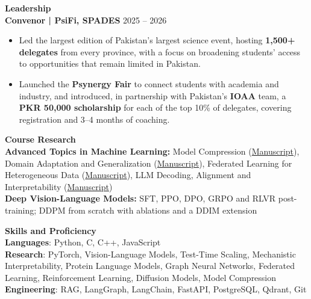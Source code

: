 \documentclass[11pt]{article}
\begin{document}
\vspace{0.3cm}
{\large \textbf{Leadership}}
\vspace{0.15cm}\\
\textbf{Convenor | PsiFi, SPADES} \hfill 2025 – 2026
\begin{itemize}[noitemsep, topsep=0pt, partopsep=0pt, parsep=0pt]
    \item Led the largest edition of Pakistan's largest science event, hosting \textbf{1,500+ delegates} from every province, with a focus on broadening students' access to opportunities that remain limited in Pakistan.
    \item Launched the \textbf{Psynergy Fair} to connect students with academia and industry, and introduced, in partnership with Pakistan's \textbf{IOAA} team, a \textbf{PKR 50,000 scholarship} for each of the top 10\% of delegates, covering registration and 3--4 months of coaching.
\end{itemize}

\vspace{0.3cm}
{\large \textbf{Course Research}}
\vspace{0.15cm}\\
\textbf{Advanced Topics in Machine Learning:} Model Compression (\href{https://drive.google.com/file/d/1n5PtRXa3tH3fdoNcJMYTQIa17mt-1_Jc/view?usp=sharing}{Manuscript}), Domain Adaptation and Generalization (\href{https://drive.google.com/file/d/1snDSYv7AWhGc1WMA92vnHNt5c0ll3335/view?usp=sharing}{Manuscript}), Federated Learning for Heterogeneous Data (\href{https://drive.google.com/file/d/1OmpKJyf--6SWd-rudZkXM4hJ6_RH7U7A/view?usp=sharing}{Manuscript}), LLM Decoding, Alignment and Interpretability (\href{https://drive.google.com/file/d/12OkTkbuaJ3cY_Kwa0Ei8ANWRuMIj-7h2/view}{Manuscript})\\
\textbf{Deep Vision-Language Models:} SFT, PPO, DPO, GRPO and RLVR post-training; DDPM from scratch with ablations and a DDIM extension

\vspace{0.3cm}
{\large \textbf{Skills and Proficiency}}
\vspace{0.15cm}\\
\textbf{Languages}: Python, C, C++, JavaScript\\
\textbf{Research}: PyTorch, Vision-Language Models, Test-Time Scaling, Mechanistic Interpretability, Protein Language Models, Graph Neural Networks, Federated Learning, Reinforcement Learning, Diffusion Models, Model Compression\\
\textbf{Engineering}: RAG, LangGraph, LangChain, FastAPI, PostgreSQL, Qdrant, Git
\end{document}
